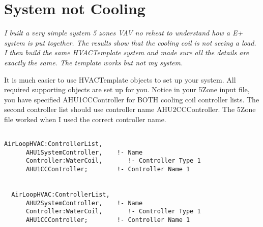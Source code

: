 \section{System not Cooling}\label{system-not-cooling}

\emph{I built a very simple system 5 zones VAV no reheat to understand how a E+ system is put together. The results show that the cooling coil is not seeing a load. I then build the same HVACTemplate system and made sure all the details are exactly the same. The template works but not my system.}

It is much easier to use HVACTemplate objects to set up your system. All required supporting objects are set up for you. Notice in your 5Zone input file, you have specified AHU1CCController for BOTH cooling coil controller lists. The second controller list should use controller name AHU2CCController. The 5Zone file worked when I used the correct controller name.

\begin{lstlisting}

AirLoopHVAC:ControllerList,
      AHU1SystemController,    !- Name
      Controller:WaterCoil,       !- Controller Type 1
      AHU1CCController;        !- Controller Name 1


  AirLoopHVAC:ControllerList,
      AHU2SystemController,    !- Name
      Controller:WaterCoil,       !- Controller Type 1
      AHU1CCController;        !- Controller Name 1
\end{lstlisting}
